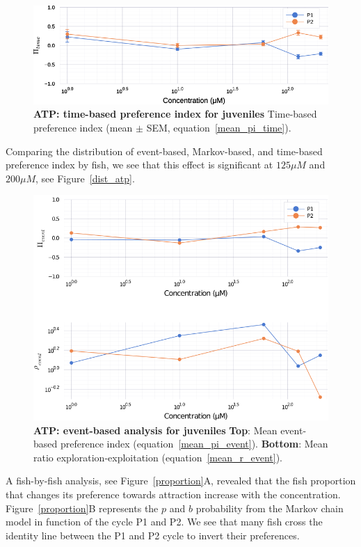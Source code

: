     \begin{figure}[h!]
      \centering
      \includegraphics[width=1\textwidth]{part_2/assets/atp.png}
      \caption{\textbf{ATP: time-based preference index for juveniles} Time-based preference index (mean $\pm$ SEM, equation~\ref{mean_pi_time}).}
      \label{atp}
    \end{figure}

  Comparing the distribution of event-based, Markov-based, and time-based preference index by fish, we see that this effect is significant at $125 \mu M$ and  $200 \mu M$, see Figure~\ref{dist_atp}.

    \begin{figure}[h!]
      \centering
      \includegraphics[width=1\textwidth]{part_2/assets/atp_event.png}
      \caption{\textbf{ATP: event-based analysis for juveniles} \textbf{Top}: Mean event-based preference index (equation~\ref{mean_pi_event}). \textbf{Bottom}: Mean ratio exploration-exploitation (equation~\ref{mean_r_event}).}
      \label{atp_event}
    \end{figure}

  A fish-by-fish analysis, see Figure~\ref{proportion}A, revealed that the fish proportion that changes its preference towards attraction increase with the concentration. Figure~\ref{proportion}B represents the $p$ and $b$ probability from the Markov chain model in function of the cycle P1 and P2. We see that many fish cross the identity line between the P1 and P2 cycle to invert their preferences.

